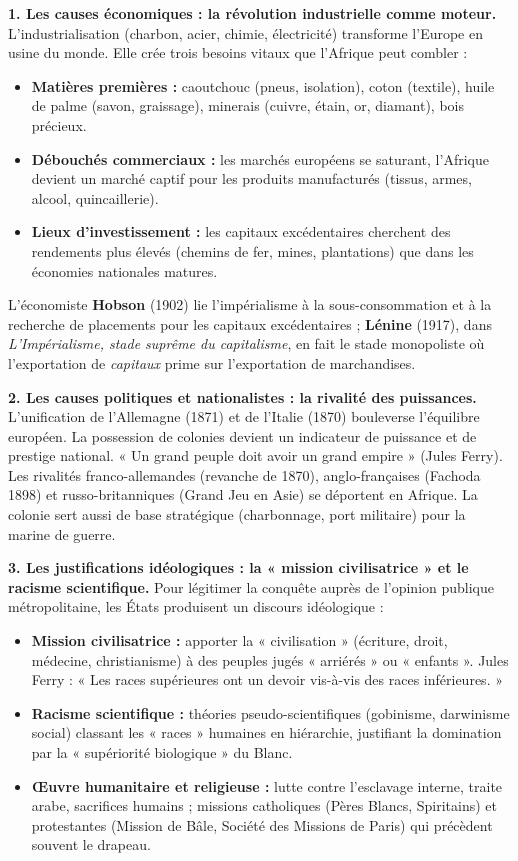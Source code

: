 \documentclass[11pt]{article}
\newcommand{\cle}[1]{{\popxbold\color{popdark}#1}}
\begin{document}
\textbf{1. Les causes économiques : la révolution industrielle comme moteur.}
L'industrialisation (charbon, acier, chimie, électricité) transforme l'Europe en usine du monde. Elle crée trois besoins vitaux que l'Afrique peut combler :
\begin{itemize}
    \item \textbf{Matières premières :} caoutchouc (pneus, isolation), coton (textile), huile de palme (savon, graissage), minerais (cuivre, étain, or, diamant), bois précieux.
    \item \textbf{Débouchés commerciaux :} les marchés européens se saturant, l'Afrique devient un marché captif pour les produits manufacturés (tissus, armes, alcool, quincaillerie).
    \item \textbf{Lieux d'investissement :} les capitaux excédentaires cherchent des rendements plus élevés (chemins de fer, mines, plantations) que dans les économies nationales matures.
\end{itemize}
\noindent L'économiste \textbf{Hobson} (1902) lie l'impérialisme à la sous-consommation et à la recherche de placements pour les capitaux excédentaires ; \textbf{Lénine} (1917), dans \emph{L'Impérialisme, stade suprême du capitalisme}, en fait le stade monopoliste où l'exportation de \emph{capitaux} prime sur l'exportation de marchandises.

\textbf{2. Les causes politiques et nationalistes : la rivalité des puissances.}
L'unification de l'Allemagne (1871) et de l'Italie (1870) bouleverse l'équilibre européen. La possession de colonies devient un indicateur de \cle{puissance} et de \cle{prestige national}. « Un grand peuple doit avoir un grand empire » (Jules Ferry). Les rivalités franco-allemandes (revanche de 1870), anglo-françaises (Fachoda 1898) et russo-britanniques (Grand Jeu en Asie) se déportent en Afrique. La colonie sert aussi de base stratégique (charbonnage, port militaire) pour la marine de guerre.

\textbf{3. Les justifications idéologiques : la « mission civilisatrice » et le racisme scientifique.}
Pour légitimer la conquête auprès de l'opinion publique métropolitaine, les États produisent un discours idéologique :
\begin{itemize}
    \item \textbf{Mission civilisatrice :} apporter la « civilisation » (écriture, droit, médecine, christianisme) à des peuples jugés « arriérés » ou « enfants ». Jules Ferry : « Les races supérieures ont un devoir vis-à-vis des races inférieures. »
    \item \textbf{Racisme scientifique :} théories pseudo-scientifiques (gobinisme, darwinisme social) classant les « races » humaines en hiérarchie, justifiant la domination par la « supériorité biologique » du Blanc.
    \item \textbf{Œuvre humanitaire et religieuse :} lutte contre l'esclavage interne, traite arabe, sacrifices humains ; missions catholiques (Pères Blancs, Spiritains) et protestantes (Mission de Bâle, Société des Missions de Paris) qui précèdent souvent le drapeau.
\end{itemize}
\end{document}
